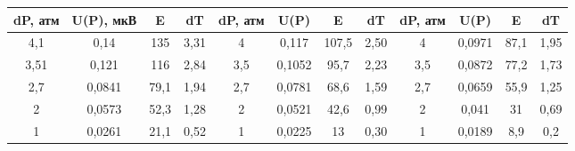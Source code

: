 \begin{tabular}{cccc|cccc|cccc}
	\toprule
	dP, атм & U(P), мкВ & E    & dT   & dP, атм & U(P)   & E     & dT   & dP, атм & U(P)   & E    & dT          \\\midrule
	4,1     & 0,14      & 135  & 3,31 & 4       & 0,117  & 107,5 & 2,50 & 4       & 0,0971 & 87,1 & 1,95 \\
	3,51    & 0,121     & 116  & 2,84 & 3,5     & 0,1052 & 95,7  & 2,23 & 3,5     & 0,0872 & 77,2 & 1,73 \\
	2,7     & 0,0841    & 79,1 & 1,94 & 2,7     & 0,0781 & 68,6  & 1,59 & 2,7     & 0,0659 & 55,9 & 1,25 \\
	2       & 0,0573    & 52,3 & 1,28 & 2       & 0,0521 & 42,6  & 0,99 & 2       & 0,041  & 31   & 0,69 \\
	1       & 0,0261    & 21,1 & 0,52 & 1       & 0,0225 & 13    & 0,30 & 1       & 0,0189 & 8,9  & 0,2  \\
	\bottomrule      
\end{tabular}
